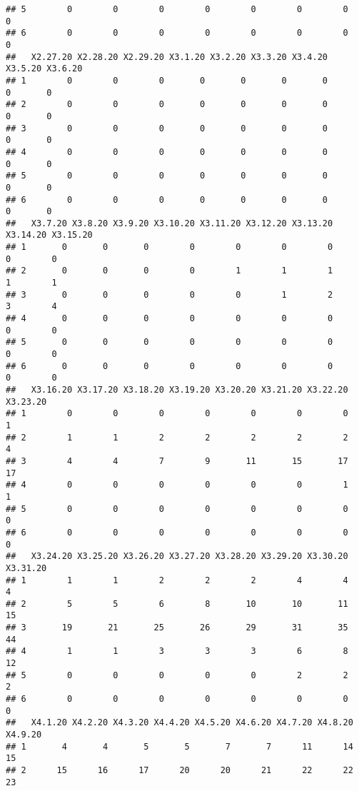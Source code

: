 \documentclass[
]{article}
\begin{document}
\begin{verbatim}
## 5        0        0        0        0        0        0        0        0
## 6        0        0        0        0        0        0        0        0
##   X2.27.20 X2.28.20 X2.29.20 X3.1.20 X3.2.20 X3.3.20 X3.4.20 X3.5.20 X3.6.20
## 1        0        0        0       0       0       0       0       0       0
## 2        0        0        0       0       0       0       0       0       0
## 3        0        0        0       0       0       0       0       0       0
## 4        0        0        0       0       0       0       0       0       0
## 5        0        0        0       0       0       0       0       0       0
## 6        0        0        0       0       0       0       0       0       0
##   X3.7.20 X3.8.20 X3.9.20 X3.10.20 X3.11.20 X3.12.20 X3.13.20 X3.14.20 X3.15.20
## 1       0       0       0        0        0        0        0        0        0
## 2       0       0       0        0        1        1        1        1        1
## 3       0       0       0        0        0        1        2        3        4
## 4       0       0       0        0        0        0        0        0        0
## 5       0       0       0        0        0        0        0        0        0
## 6       0       0       0        0        0        0        0        0        0
##   X3.16.20 X3.17.20 X3.18.20 X3.19.20 X3.20.20 X3.21.20 X3.22.20 X3.23.20
## 1        0        0        0        0        0        0        0        1
## 2        1        1        2        2        2        2        2        4
## 3        4        4        7        9       11       15       17       17
## 4        0        0        0        0        0        0        1        1
## 5        0        0        0        0        0        0        0        0
## 6        0        0        0        0        0        0        0        0
##   X3.24.20 X3.25.20 X3.26.20 X3.27.20 X3.28.20 X3.29.20 X3.30.20 X3.31.20
## 1        1        1        2        2        2        4        4        4
## 2        5        5        6        8       10       10       11       15
## 3       19       21       25       26       29       31       35       44
## 4        1        1        3        3        3        6        8       12
## 5        0        0        0        0        0        2        2        2
## 6        0        0        0        0        0        0        0        0
##   X4.1.20 X4.2.20 X4.3.20 X4.4.20 X4.5.20 X4.6.20 X4.7.20 X4.8.20 X4.9.20
## 1       4       4       5       5       7       7      11      14      15
## 2      15      16      17      20      20      21      22      22      23

\end{verbatim}
\end{document}
